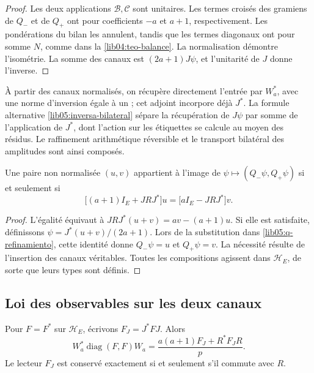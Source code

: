 \begin{proof}
Les deux applications \(\mathcal B,\mathcal C\) sont unitaires.
Les termes croisés des gramiens de \(Q_-\) et de \(Q_+\) ont pour
coefficients \(-a\) et \(a+1\), respectivement. Les pondérations
du bilan les annulent, tandis que les termes diagonaux ont pour somme
\(N\), comme dans la \cref{lib04:teo-balance}. La normalisation
démontre l’isométrie. La somme des canaux est
\((2a+1)J\psi\), et l’unitarité de \(J\) donne l’inverse.
\end{proof}

À partir des canaux normalisés, on récupère directement l'entrée par \(W_a^*\), avec une norme d'inversion égale à un ; cet adjoint incorpore déjà \(J^*\). La formule alternative \eqref{lib05:inversa-bilateral} sépare la récupération de \(J\psi\) par somme de l'application de \(J^*\), dont l'action sur les étiquettes se calcule au moyen des résidus. Le raffinement arithmétique réversible et le transport bilatéral des amplitudes sont ainsi composés.

\begin{proposition}
\label{lib05:prop-compatibilidad}
Une paire non normalisée \((u,v)\) appartient à l’image de
\(\psi\mapsto(Q_-\psi,Q_+\psi)\) si et seulement si
\begin{equation}
 \bigl[(a+1)I_E+JRJ^*\bigr]u
 =\bigl[aI_E-JRJ^*\bigr]v.
 \label{lib05:compatibilidad}
\end{equation}
\end{proposition}

\begin{proof}
L’égalité équivaut à
\(JRJ^*(u+v)=av-(a+1)u\). Si elle est satisfaite, définissons
\(\psi=J^*(u+v)/(2a+1)\). Lors de la substitution dans
\eqref{lib05:q-refinamiento}, cette identité donne
\(Q_-\psi=u\) et \(Q_+\psi=v\). La nécessité résulte de
l’insertion des canaux véritables. Toutes les compositions agissent
dans \(\mathscr H_E\), de sorte que leurs types sont définis.
\end{proof}

\subsection{Loi des observables sur les deux canaux}
\label{lib05:ley-lectores}

\begin{theorem}
\label{lib05:teo-lector}
Pour \(F=F^*\) sur \(\mathscr H_E\), écrivons
\(F_J=J^*FJ\). Alors
\begin{equation}
 W_a^*\operatorname{diag}(F,F)W_a
 =\frac{a(a+1)F_J+R^*F_JR}{p}.
 \label{lib05:lector-bilateral}
\end{equation}
Le lecteur \(F_J\) est conservé exactement si et seulement s'il commute avec \(R\).
\end{theorem}

